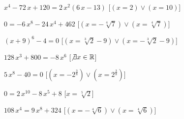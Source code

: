 \begin{esercizio}
\begin{enumeratea}
\item ${x}^{4}-72\,x+120=2\,{x}^{2} \left( 6\,x-13 \right) $ 
\hfill [$(x=2)\vee (x=10)$]
\item $0=-6\,{x}^{8}-24\,{x}^{4}+462$ 
\hfill [$(x=-\sqrt [4]{7})\vee (x=\sqrt [4]{7})$]
\item $ \left( x+9 \right) ^{6}-4=0$ 
\hfill [$(x=\sqrt [3]{2}-9)\vee (x=-\sqrt [3]{2}-9)$]
\item $128\,{x}^{3}+800=-8\,{x}^{6}$ 
\hfill [$\not\exists x \in \mathbb{R}$]
\item $5\,{x}^{8}-40=0$ 
\hfill [$(x=-{2}^{{\frac {3}{8}}})\vee (x={2}^{{\frac {3}{8}}})$]
\item $0=2\,{x}^{10}-8\,{x}^{5}+8$ 
\hfill [$x=\sqrt [5]{2}$]
\item $108\,{x}^{4}=9\,{x}^{8}+324$ 
\hfill [$(x=-\sqrt [4]{6})\vee (x=\sqrt [4]{6})$]
\end{enumeratea}
\end{esercizio}

